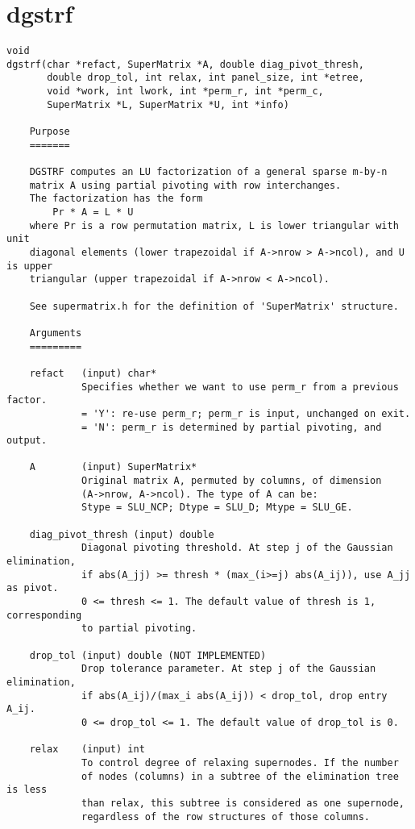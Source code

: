 \section{dgstrf}
\begin{verbatim}
void
dgstrf(char *refact, SuperMatrix *A, double diag_pivot_thresh, 
       double drop_tol, int relax, int panel_size, int *etree, 
       void *work, int lwork, int *perm_r, int *perm_c, 
       SuperMatrix *L, SuperMatrix *U, int *info)

    Purpose
    =======
   
    DGSTRF computes an LU factorization of a general sparse m-by-n
    matrix A using partial pivoting with row interchanges.
    The factorization has the form
        Pr * A = L * U
    where Pr is a row permutation matrix, L is lower triangular with unit
    diagonal elements (lower trapezoidal if A->nrow > A->ncol), and U is upper 
    triangular (upper trapezoidal if A->nrow < A->ncol).
   
    See supermatrix.h for the definition of 'SuperMatrix' structure.
   
    Arguments
    =========
   
    refact   (input) char*
             Specifies whether we want to use perm_r from a previous factor.
             = 'Y': re-use perm_r; perm_r is input, unchanged on exit.
             = 'N': perm_r is determined by partial pivoting, and output.
   
    A        (input) SuperMatrix*
             Original matrix A, permuted by columns, of dimension
             (A->nrow, A->ncol). The type of A can be:
             Stype = SLU_NCP; Dtype = SLU_D; Mtype = SLU_GE.
   
    diag_pivot_thresh (input) double
             Diagonal pivoting threshold. At step j of the Gaussian elimination,
             if abs(A_jj) >= thresh * (max_(i>=j) abs(A_ij)), use A_jj as pivot.
             0 <= thresh <= 1. The default value of thresh is 1, corresponding
             to partial pivoting.
   
    drop_tol (input) double (NOT IMPLEMENTED)
             Drop tolerance parameter. At step j of the Gaussian elimination,
             if abs(A_ij)/(max_i abs(A_ij)) < drop_tol, drop entry A_ij.
             0 <= drop_tol <= 1. The default value of drop_tol is 0.
   
    relax    (input) int
             To control degree of relaxing supernodes. If the number
             of nodes (columns) in a subtree of the elimination tree is less
             than relax, this subtree is considered as one supernode,
             regardless of the row structures of those columns.
   

\end{verbatim}
